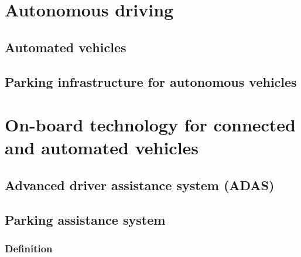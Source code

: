 \documentclass[
]{book}
\begin{document}
\hypertarget{connected}{%
\chapter{Autonomous driving}\label{connected}}

\hypertarget{av}{%
\section{Automated vehicles}\label{av}}

\hypertarget{parking_av}{%
\section{Parking infrastructure for autonomous vehicles}\label{parking_av}}

\hypertarget{onboard}{%
\chapter{On-board technology for connected and automated vehicles}\label{onboard}}

\hypertarget{adas}{%
\section{Advanced driver assistance system (ADAS)}\label{adas}}

\hypertarget{parking_assistance}{%
\section{Parking assistance system}\label{parking_assistance}}

\hypertarget{definition-18}{%
\subsection*{Definition}\label{definition-18}}
\end{document}
